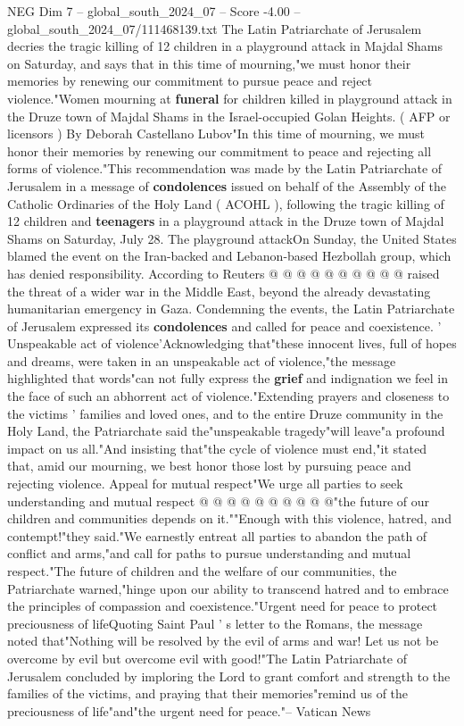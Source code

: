 \begin{textsample}{NEG Dim 7 – global\_south\_2024\_07 – Score -4.00 – global\_south\_2024\_07/111468139.txt}  \label{ex:f7_neg_339}
The Latin Patriarchate of Jerusalem decries the tragic killing of 12 children in a playground attack in Majdal Shams on Saturday, and says that in this time of mourning,"we must honor their memories by renewing our commitment to pursue peace and reject violence."Women mourning at \textbf{funeral} for children killed in playground attack in the Druze town of Majdal Shams in the Israel-occupied Golan Heights. ( AFP or licensors ) By Deborah Castellano Lubov"In this time of mourning, we must honor their memories by renewing our commitment to peace and rejecting all forms of violence."This recommendation was made by the Latin Patriarchate of Jerusalem in a message of \textbf{condolences} issued on behalf of the Assembly of the Catholic Ordinaries of the Holy Land ( ACOHL ), following the tragic killing of 12 children and \textbf{teenagers} in a playground attack in the Druze town of Majdal Shams on Saturday, July 28.
The playground attackOn Sunday, the United States blamed the event on the Iran-backed and Lebanon-based Hezbollah group, which has denied responsibility.
According to Reuters @ @ @ @ @ @ @ @ @ @ raised the threat of a wider war in the Middle East, beyond the already devastating humanitarian emergency in Gaza.
Condemning the events, the Latin Patriarchate of Jerusalem expressed its \textbf{condolences} and called for peace and coexistence. ' Unspeakable act of violence'Acknowledging that"these innocent lives, full of hopes and dreams, were taken in an unspeakable act of violence,"the message highlighted that words"can not fully express the \textbf{grief} and indignation we feel in the face of such an abhorrent act of violence."Extending prayers and closeness to the victims ' families and loved ones, and to the entire Druze community in the Holy Land, the Patriarchate said the"unspeakable tragedy"will leave"a profound impact on us all."And insisting that"the cycle of violence must end,"it stated that, amid our mourning, we best honor those lost by pursuing peace and rejecting violence.
Appeal for mutual respect"We urge all parties to seek understanding and mutual respect @ @ @ @ @ @ @ @ @ @"the future of our children and communities depends on it.""Enough with this violence, hatred, and contempt!"they said."We earnestly entreat all parties to abandon the path of conflict and arms,"and call for paths to pursue understanding and mutual respect."The future of children and the welfare of our communities, the Patriarchate warned,"hinge upon our ability to transcend hatred and to embrace the principles of compassion and coexistence."Urgent need for peace to protect preciousness of lifeQuoting Saint Paul ' s letter to the Romans, the message noted that"Nothing will be resolved by the evil of arms and war!
Let us not be overcome by evil but overcome evil with good!"The Latin Patriarchate of Jerusalem concluded by imploring the Lord to grant comfort and strength to the families of the victims, and praying that their memories"remind us of the preciousness of life"and"the urgent need for peace."-- Vatican News

\end{textsample}

